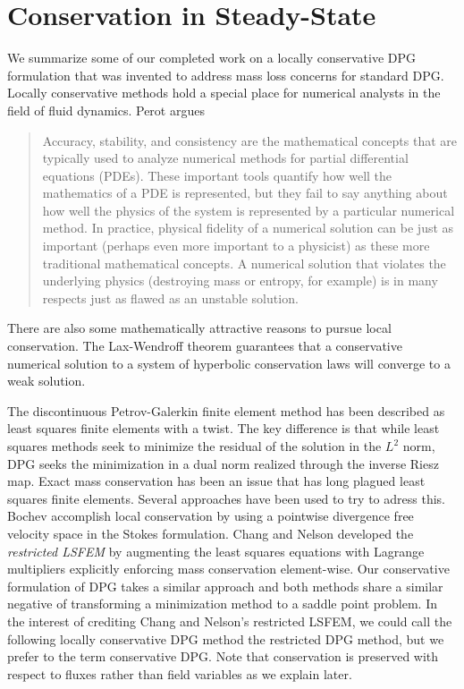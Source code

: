 \documentclass[Proposal.tex]{subfiles}
\begin{document}
\chapter{Conservation in Steady-State}
\label{sec:conservation}
We summarize some of our completed work on a locally conservative DPG formulation that was invented to address mass loss concerns for standard DPG.
Locally conservative methods hold a special place for numerical analysts in
the field of fluid dynamics.
Perot\cite{Perot2011} argues
\begin{quote}
Accuracy, stability, and consistency are the mathematical concepts that are
typically used to analyze numerical methods for partial differential equations
(PDEs). These important tools quantify how well the mathematics of a PDE is
represented, but they fail to say anything about how well the physics of the
system is represented by a particular numerical method. In practice, physical
fidelity of a numerical solution can be just as important (perhaps even more
important to a physicist) as these more traditional mathematical concepts. A
numerical solution that violates the underlying physics (destroying mass or
entropy, for example) is in many respects just as flawed as an unstable
solution.
\end{quote}
There are also some mathematically attractive reasons to pursue local
conservation. The Lax-Wendroff theorem guarantees that a conservative numerical
solution to a system of hyperbolic conservation laws will converge to a
weak solution.

The discontinuous Petrov-Galerkin finite element method has been described as
least squares finite elements with a twist. The key difference is that while least
squares methods seek to minimize the residual of the solution in the $L^2$
norm, DPG seeks the minimization in a dual norm realized through the
inverse Riesz map. Exact mass conservation has been an issue that has long plagued
least squares finite elements. Several approaches have been
used to try to adress this. Bochev \etal\cite{Bochev2010} accomplish local
conservation by using a pointwise divergence free velocity space in the Stokes
formulation.  Chang and Nelson\cite{ChangNelson1997} developed the
\emph{restricted LSFEM}\cite{ChangNelson1997} by augmenting the least squares
equations with Lagrange multipliers explicitly enforcing mass conservation
element-wise. Our conservative formulation of DPG takes a similar approach and
both methods share a similar negative of transforming a minimization method to a
saddle point problem. In the interest of crediting Chang and Nelson's
restricted LSFEM, we could call the following locally conservative DPG method the
restricted DPG method, but we prefer to the term conservative DPG.
Note that conservation is preserved with respect to fluxes rather than field variables as we explain later.
\end{document}
